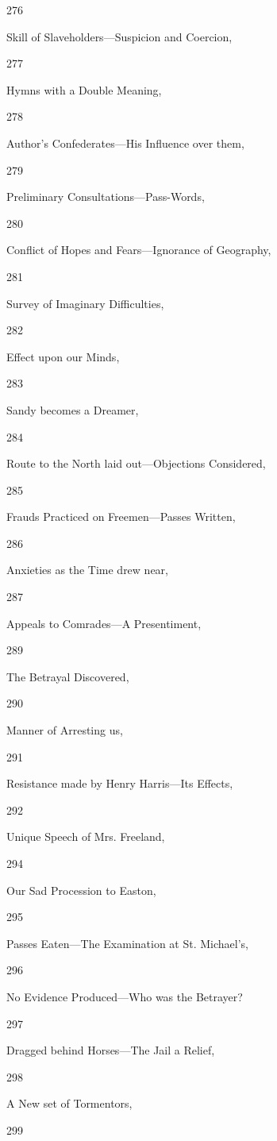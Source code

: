 276

Skill of Slaveholders---Suspicion and Coercion,

277

Hymns with a Double Meaning,

278

Author's Confederates---His Influence over them,

279

Preliminary Consultations---Pass-Words,

280

Conflict of Hopes and Fears---Ignorance of Geography,

281

Survey of Imaginary Difficulties,

282

Effect upon our Minds,

283

Sandy becomes a Dreamer,

284

Route to the North laid out---Objections Considered,

285

Frauds Practiced on Freemen---Passes Written,

286

Anxieties as the Time drew near,

287

Appeals to Comrades---A Presentiment,

289

The Betrayal Discovered,

290

Manner of Arresting us,

291

Resistance made by Henry Harris---Its Effects,

292

Unique Speech of Mrs. Freeland,

294

Our Sad Procession to Easton,

295

Passes Eaten---The Examination at St. Michael's,

296

No Evidence Produced---Who was the Betrayer?

297

Dragged behind Horses---The Jail a Relief,

298

A New set of Tormentors,

299

